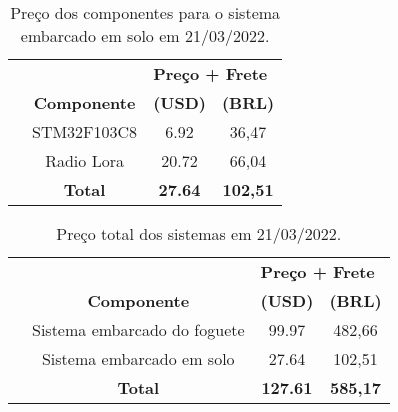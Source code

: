 \begin{table}[!thb]
	\centering
	\caption{Preço dos componentes para o sistema embarcado em solo em 21/03/2022.}
    \begin{adjustbox}{max width={\textwidth},keepaspectratio}%
	\begin{tabular}{|ll|c|c|}
		\cline{3-4}
		\multicolumn{1}{c}{\textbf{}} & 
		\multicolumn{1}{c|}{\textbf{}} & 
		\multicolumn{2}{l|}{\textbf{Preço + Frete}} 
		\\ \cline{1-4}
		 & \multicolumn{1}{c|}{\textbf{Componente}} & \textbf{(USD)} & \textbf{(BRL)}
		 \\ \hline
		& \multicolumn{1}{c|}{STM32F103C8} & 6.92 & 36,47
		 \\ \hline
        & \multicolumn{1}{c|}{Radio Lora } & 20.72 & 66,04
		 \\ \hline

		 
		 
		 
		 
		 & \multicolumn{1}{c|}{\textbf{Total}} & \textbf{27.64} & \textbf{102,51}
		 \\ \hline

	\end{tabular}
    \end{adjustbox}
    \label{tab:Orçamento2} 
\end{table}






\begin{table}[!thb]
	\centering
	\caption{Preço total dos sistemas em 21/03/2022.}
    \begin{adjustbox}{max width={\textwidth},keepaspectratio}%
	\begin{tabular}{|ll|c|c|}
		\cline{3-4}
		\multicolumn{1}{c}{\textbf{}} & 
		\multicolumn{1}{c|}{\textbf{}} & 
		\multicolumn{2}{l|}{\textbf{Preço + Frete}} 
		\\ \cline{1-4}
		 & \multicolumn{1}{c|}{\textbf{Componente}} & \textbf{(USD)} & \textbf{(BRL)}
		 \\ \hline
		& \multicolumn{1}{c|}{Sistema embarcado do foguete} & 99.97 & 482,66
		 \\ \hline
        & \multicolumn{1}{c|}{Sistema embarcado em solo } & 27.64 & 102,51
		 \\ \hline

		 
		 
		 
		 
		 & \multicolumn{1}{c|}{\textbf{Total}} & \textbf{127.61} & \textbf{585,17}
		 \\ \hline

	\end{tabular}
    \end{adjustbox}
    \label{tab:Orçamento3} 
\end{table}


















